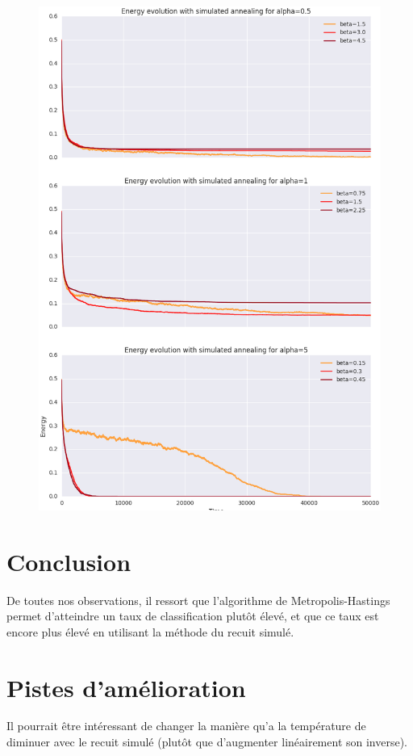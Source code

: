\documentclass[twocolumn]{article}
\begin{document}
		\begin{figure}
		\includegraphics[width=\columnwidth]{../tobekept/ex1_sim_1683536997971113732-r.png}
		\end{figure}
		
	\section{Conclusion}
		De toutes nos observations, il ressort que l'algorithme de Metropolis-Hastings permet d'atteindre un taux de classification plutôt élevé, et que ce taux est encore plus élevé en utilisant la méthode du recuit simulé.
		
	\section{Pistes d'amélioration}
		Il pourrait être intéressant de changer la manière qu'a la température de diminuer avec le recuit simulé (plutôt que d'augmenter linéairement son inverse).
		
\end{document}
